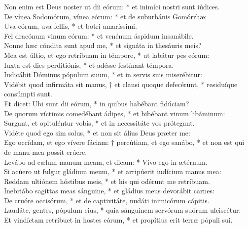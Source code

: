 {	Non enim est Deus noster ut dii eórum: * et inimíci nostri sunt iúdices. \\
	De vínea Sodomórum, vínea eórum: * et de suburbánis Gomórrhæ:  \\
	Uva eórum, uva fellis, * et botri amaríssimi. \\
	Fel dracónum vinum eórum: * et venénum áspidum insanábile. \\
	Nonne hæc cóndita sunt apud me, * et signáta in thesáuris meis? \\
	Mea est últio, et ego retríbuam in témpore, * ut labátur pes eórum:  \\
	Iuxta est dies perditiónis, * et adésse festínant témpora. \\
	Iudicábit Dóminus pópulum suum, * et in servis suis miserébitur:  \\
	Vidébit quod infirmáta sit manus, † et clausi quoque defecérunt, * residuíque consúmpti sunt. \\
	Et dicet: Ubi sunt dii eórum, * in quibus habébant fidúciam? \\
	De quorum víctimis comedébant ádipes, * et bibébant vinum libáminum:  \\
	Surgant, et opituléntur vobis, * et in necessitáte vos prótegant. \\
	Vidéte quod ego sim solus, * et non sit álius Deus præter me:  \\
	Ego occídam, et ego vívere fáciam: † percútiam, et ego sanábo, * et non est qui de manu mea possit erúere. \\
	Levábo ad cælum manum meam, et dicam: * Vivo ego in ætérnum. \\
	Si acúero ut fulgur gládium meum, * et arripúerit iudícium manus mea:  \\
	Reddam ultiónem hóstibus meis, * et his qui odérunt me retríbuam. \\
	Inebriábo sagíttas meas sánguine, * et gládius meus devorábit carnes:  \\
	De cruóre occisórum, * et de captivitáte, nudáti inimicórum cápitis. \\
	Laudáte, gentes, pópulum eius, * quia sánguinem servórum suórum ulciscétur:  \\
	Et vindíctam retríbuet in hostes eórum, * et propítius erit terræ pópuli sui. \\
}

